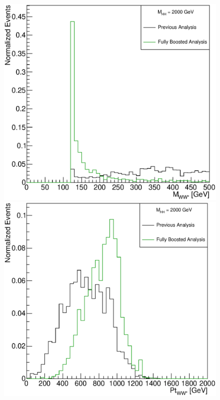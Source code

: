 \begin{figure}[h]
\begin{center}
\includegraphics[scale=0.25]{figures/WHad_plots_john_withcuts/electron/hww_m_Xhh2000}
\includegraphics[scale=0.25]{figures/WHad_plots_john_withcuts/electron/hww_pt_Xhh2000}\\

\end{center}
\end{figure}
